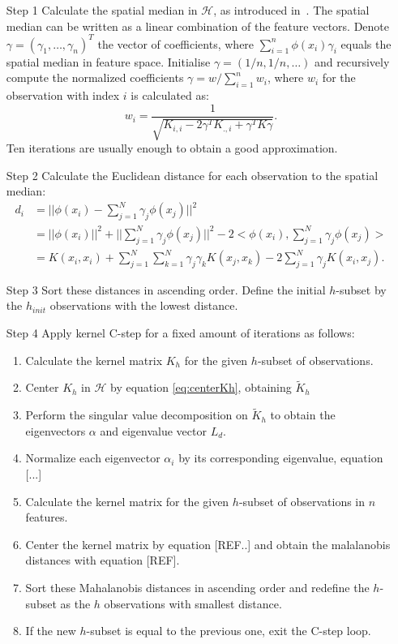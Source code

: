 \documentclass[preprint,12pt]{elsarticle}
\begin{document}
	\begin{itemize}
		\item [Step 1] Calculate the spatial median in $\mathcal{H}$, as introduced in~\cite{debruyne2010detecting}. The spatial median can be written as a linear combination of the feature vectors. Denote $\gamma = (\gamma_1, \dots, \gamma_n)^T$ the vector of coefficients, where  $\sum_{i=1}^{n} \phi(x_i) \gamma_i$ equals the spatial median in feature space. Initialise $\gamma = (1/n, 1/n, \dots)$ and recursively compute the normalized coefficients $\gamma = w / \sum_{i=1}^{n}w_i$, where $w_i$ for the observation with index $i$ is calculated as:
		\begin{equation}
		w_i = \frac{1}{\sqrt{ K_{i,i} - 2 \gamma^T K_{., i} + \gamma^T K \gamma}}.
		\end{equation}
		Ten iterations are usually enough to obtain a good approximation.	
		\item [Step 2] Calculate the Euclidean distance for each observation to the spatial median:
		\begin{align}
		d_i &= || \phi(x_i) - \sum_{j=1}^N \gamma_j \phi(x_j)||^2 \\
		&= || \phi(x_i)||^2 + || \sum_{j=1}^N \gamma_j \phi(x_j)||^2 - 2 <\phi(x_i),\sum_{j=1}^N \gamma_j \phi(x_j)> \\
		&= K(x_i,x_i) + \sum_{j=1}^N \sum_{k=1}^N \gamma_j \gamma_k K(x_j,x_k) - 2 \sum_{j=1}^N\gamma_j K(x_i,x_j).
		\end{align}
		\item [Step 3] 	Sort these distances in ascending order. Define the initial $h$-subset by the $h_{init}$ observations with the lowest distance.	
		
		\item [Step 4] Apply kernel C-step for a fixed amount of iterations as follows:
		
		\begin{enumerate}
			\item Calculate the kernel matrix $K_h$ for the given $h$-subset of observations.
			\item Center $K_h$ in $\mathcal{H}$ by equation \ref{eq:centerKh}, obtaining $\tilde{K}_h$
			\item Perform the singular value decomposition on $\tilde{K}_h$ to obtain the eigenvectors $\alpha$ and eigenvalue vector $L_d$.
			\item Normalize each eigenvector $\alpha_i$ by its corresponding eigenvalue, equation [...]
			\item Calculate the kernel matrix for the given $h$-subset of observations in $n$ features.
			\item Center the kernel matrix by equation [REF..] and obtain the malalanobis distances with equation [REF].
			\item Sort these Mahalanobis distances in ascending order and redefine the $h$-subset as the $h$ observations with smallest distance.
			\item If the new $h$-subset is equal to the previous one, exit the C-step loop.
		\end{enumerate}
		

\end{itemize}
\end{document}
